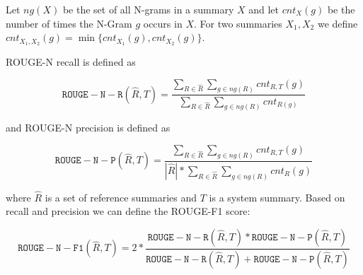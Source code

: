 \documentclass[a4paper,BCOR=10mm]{report}
\numberwithin{lemma}{chapter}
\numberwithin{definition}{chapter}
\begin{document}
Let $\mathit{ng}(X)$ be the set of all N-grams in a summary $X$ and let $\mathit{cnt}_{X}(g)$ be the number of times the N-Gram $g$ occurs in $X$.
For two summaries $X_1, X_2$ we define $\mathit{cnt}_{X_1, X_2}(g) = \min\{  \mathit{cnt}_{X_1}(g),  \mathit{cnt}_{X_2}(g) \}$.

ROUGE-N recall is defined as

\begin{equation}
    \mathtt{ROUGE-N-R}(\hat{R}, T) =  \frac{
        \sum_{R \in \hat{R}}
        \sum_{g \in \mathit{ng}(R)}
        \mathit{cnt}_{R,T}(g)
    } {
        \sum_{R \in \hat{R}}
        \sum_{g \in \mathit{ng}(R)}
        \mathit{cnt}_{R(g)}
    }
\end{equation}

and ROUGE-N precision is defined as

\begin{equation}
    \mathtt{ROUGE-N-P}(\hat{R}, T) =  \frac{\sum_{R \in \hat{R}} \sum_{g \in \mathit{ng}(R)} \mathit{cnt}_{R,T}(g)}{|\hat{R}| * \sum_{R \in \hat{R}} \sum_{g \in \mathit{ng}(R)} \mathit{cnt}_{R}(g)}
\end{equation}

where $\hat{R}$ is a set of reference summaries and $T$ is a system summary.
Based on recall and precision we can define the ROUGE-F1 score:

\begin{equation}
    \mathtt{ROUGE-N-F1}(\hat{R}, T) = 2 * \frac{\mathtt{ROUGE-N-R}(\hat{R}, T) * \mathtt{ROUGE-N-P}(\hat{R}, T)}{\mathtt{ROUGE-N-R}(\hat{R}, T) + \mathtt{ROUGE-N-P}(\hat{R}, T)}
\end{equation}
\end{document}
